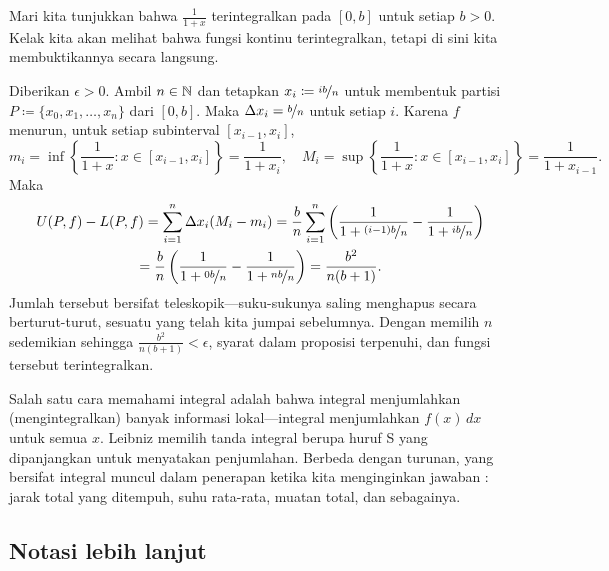 \begin{example}
Mari kita tunjukkan bahwa $\frac{1}{1+x}$ terintegralkan pada $[0,b]$ untuk setiap $b > 0$.
Kelak kita akan melihat bahwa fungsi kontinu terintegralkan, tetapi di sini kita
membuktikannya secara langsung.

Diberikan $\epsilon > 0$.  Ambil $n \in {\mathbb{N}}$ dan
tetapkan $x_i \coloneqq \nicefrac{ib}{n}$ untuk membentuk 
partisi $P \coloneqq \{ x_0,x_1,\ldots,x_n \}$ dari $[0,b]$.
Maka $\Delta x_i = \nicefrac{b}{n}$ untuk setiap $i$.  
Karena $f$ menurun, untuk setiap subinterval $[x_{i-1},x_i]$,
\begin{equation*}
m_i
=
\inf \left\{ \frac{1}{1+x} : x \in [x_{i-1},x_i] \right\} = \frac{1}{1+x_i} ,
\quad
M_i
=
\sup \left\{ \frac{1}{1+x} : x \in [x_{i-1},x_i] \right\} =
\frac{1}{1+x_{i-1}} .
\end{equation*}
Maka
\begin{multline*}
U(P,f)-L(P,f)
=
\sum_{i=1}^n
\Delta x_i
(M_i-m_i)
=
\frac{b}{n}
\sum_{i=1}^n 
\left( \frac{1}{1+\nicefrac{(i-1)b}{n}} - \frac{1}{1+\nicefrac{ib}{n}} \right) 
\\
=
\frac{b}{n}
\left( \frac{1}{1+\nicefrac{0b}{n}} - \frac{1}{1+\nicefrac{nb}{n}} \right) 
=
\frac{b^2}{n(b+1)} .
\end{multline*}
Jumlah tersebut bersifat teleskopik---suku-sukunya saling menghapus secara berturut-turut,
sesuatu yang telah kita jumpai sebelumnya.
Dengan memilih $n$ sedemikian sehingga
$\frac{b^2}{n(b+1)} < \epsilon$, syarat dalam proposisi terpenuhi, dan fungsi
tersebut terintegralkan.
\end{example}

\begin{remark}
Salah satu cara memahami integral adalah bahwa integral menjumlahkan (mengintegralkan) banyak
informasi lokal---integral menjumlahkan $f(x)\,dx$ untuk semua $x$.
Leibniz memilih tanda integral berupa huruf S yang dipanjangkan untuk menyatakan penjumlahan.
Berbeda dengan turunan, yang bersifat  
integral muncul dalam penerapan ketika
kita menginginkan jawaban : jarak total yang ditempuh, suhu
rata-rata, muatan total, dan sebagainya.
\end{remark}

\subsection{Notasi lebih lanjut}

